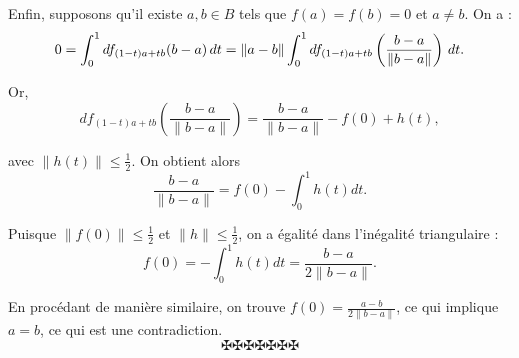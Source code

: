 Enfin, supposons qu'il existe $a, b \in B$ tels que $f (a) = f (b) = 0$ et $a
\neq b$. On a :
\[ 0 = \int_0^1 df_{(1 - t) a + tb} (b - a) \hspace{0.17em} dt =\|a - b\|
   \int_0^1 df_{(1 - t) a + tb} \left( \frac{b - a}{\|b - a\|} \right) 
   \hspace{0.17em} dt. \]


Or,
\[ df_{(1 - t) a + tb} \left( \frac{b - a}{\|b - a\|} \right) = \frac{b -
   a}{\|b - a\|} - f (0) + h (t), \]


avec $\|h (t)\| \leq \frac{1}{2}$. On obtient alors
\[ \frac{b - a}{\|b - a\|} = f (0) - \int_0^1 h (t) d t. \]


Puisque $\|f (0)\| \leq \frac{1}{2}$ et $\|h\| \leq \frac{1}{2}$, on a
{\'e}galit{\'e} dans l'in{\'e}galit{\'e} triangulaire :
\[ f (0) = - \int_0^1 h (t) d t = \frac{b - a}{2\|b - a\|} . \]


En proc{\'e}dant de mani{\`e}re similaire, on trouve $f (0) = \frac{a -
b}{2\|b - a\|}$, ce qui implique $a = b$, ce qui est une contradiction.
\[ \maltese \maltese \maltese \maltese \maltese \maltese \maltese \]
